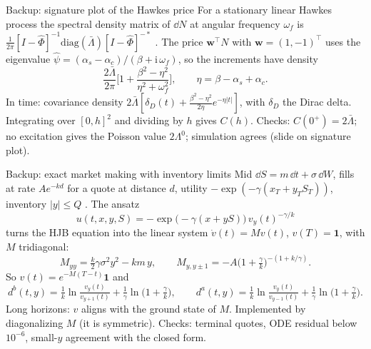 \begin{frame}{Backup: signature plot of the Hawkes price}
  \small
  For a stationary linear Hawkes process the spectral density matrix of $\dd N$ at angular frequency $\omega_f$ is $\frac{1}{2\pi}[I - \hat\Phi]^{-1}\mathrm{diag}(\bar\Lambda)[I - \hat\Phi]^{-*}$ \citep{hawkes1971spectra}. The price $\mathbf{w}^\top N$ with $\mathbf{w} = (1,-1)^\top$ uses the eigenvalue $\hat\psi = (\alpha_s - \alpha_c)/(\beta + \mathrm{i}\,\omega_f)$, so the increments have density
  \[ \frac{2\bar\Lambda}{2\pi}\Big[1 + \frac{\beta^2 - \eta^2}{\eta^2 + \omega_f^2}\Big], \qquad \eta = \beta - \alpha_s + \alpha_c . \]
  In time: covariance density $2\bar\Lambda[\delta_D(t) + \frac{\beta^2-\eta^2}{2\eta}e^{-\eta|t|}]$, with $\delta_D$ the Dirac delta. Integrating over $[0,h]^2$ and dividing by $h$ gives $C(h)$. Checks: $C(0^+) = 2\bar\Lambda$; no excitation gives the Poisson value $2\Lambda^0$; simulation agrees (slide on signature plot).
\end{frame}

\begin{frame}{Backup: exact market making with inventory limits}
  \small
  Mid $\dd S = m\,\dd t + \sigma\,\dd W$, fills at rate $A e^{-kd}$ for a quote at distance $d$, utility $-\exp(-\gamma(x_T + y_TS_T))$, inventory $|y|\le Q$ \citep{gueant2013dealing}. The ansatz
  \[ u(t,x,y,S) = -\exp\big(-\gamma(x + yS)\big)\,v_y(t)^{-\gamma/k} \]
  turns the HJB equation into the linear system $\dot v(t) = M v(t)$, $v(T) = \mathbf{1}$, with $M$ tridiagonal:
  \[ M_{yy} = \tfrac{k}{2}\gamma\sigma^2 y^2 - k m\,y, \qquad M_{y,y\pm1} = -A\big(1+\tfrac{\gamma}{k}\big)^{-(1+k/\gamma)} . \]
  So $v(t) = e^{-M(T-t)}\mathbf{1}$ and
  \[ d^b(t,y) = \tfrac1k\ln\tfrac{v_y(t)}{v_{y+1}(t)} + \tfrac1\gamma\ln\big(1+\tfrac\gamma k\big), \qquad d^a(t,y) = \tfrac1k\ln\tfrac{v_y(t)}{v_{y-1}(t)} + \tfrac1\gamma\ln\big(1+\tfrac\gamma k\big). \]
  Long horizons: $v$ aligns with the ground state of $M$. Implemented by diagonalizing $M$ (it is symmetric). Checks: terminal quotes, ODE residual below $10^{-6}$, small-$y$ agreement with the closed form.
\end{frame}

